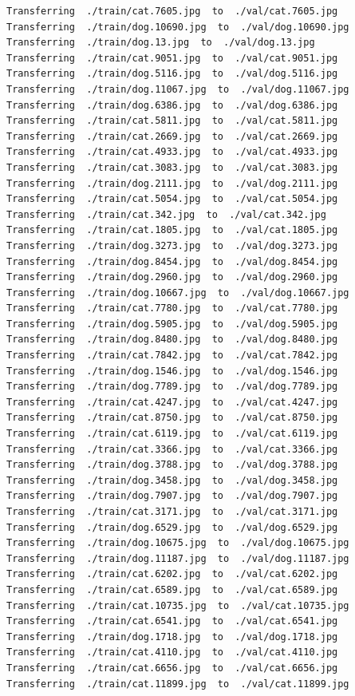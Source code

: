 \documentclass[]{book}
\theoremstyle{definition}
\theoremstyle{definition}
\theoremstyle{definition}
\theoremstyle{remark}
\begin{document}
\begin{verbatim}
Transferring  ./train/cat.7605.jpg  to  ./val/cat.7605.jpg
Transferring  ./train/dog.10690.jpg  to  ./val/dog.10690.jpg
Transferring  ./train/dog.13.jpg  to  ./val/dog.13.jpg
Transferring  ./train/cat.9051.jpg  to  ./val/cat.9051.jpg
Transferring  ./train/dog.5116.jpg  to  ./val/dog.5116.jpg
Transferring  ./train/dog.11067.jpg  to  ./val/dog.11067.jpg
Transferring  ./train/dog.6386.jpg  to  ./val/dog.6386.jpg
Transferring  ./train/cat.5811.jpg  to  ./val/cat.5811.jpg
Transferring  ./train/cat.2669.jpg  to  ./val/cat.2669.jpg
Transferring  ./train/cat.4933.jpg  to  ./val/cat.4933.jpg
Transferring  ./train/cat.3083.jpg  to  ./val/cat.3083.jpg
Transferring  ./train/dog.2111.jpg  to  ./val/dog.2111.jpg
Transferring  ./train/cat.5054.jpg  to  ./val/cat.5054.jpg
Transferring  ./train/cat.342.jpg  to  ./val/cat.342.jpg
Transferring  ./train/cat.1805.jpg  to  ./val/cat.1805.jpg
Transferring  ./train/dog.3273.jpg  to  ./val/dog.3273.jpg
Transferring  ./train/dog.8454.jpg  to  ./val/dog.8454.jpg
Transferring  ./train/dog.2960.jpg  to  ./val/dog.2960.jpg
Transferring  ./train/dog.10667.jpg  to  ./val/dog.10667.jpg
Transferring  ./train/cat.7780.jpg  to  ./val/cat.7780.jpg
Transferring  ./train/dog.5905.jpg  to  ./val/dog.5905.jpg
Transferring  ./train/dog.8480.jpg  to  ./val/dog.8480.jpg
Transferring  ./train/cat.7842.jpg  to  ./val/cat.7842.jpg
Transferring  ./train/dog.1546.jpg  to  ./val/dog.1546.jpg
Transferring  ./train/dog.7789.jpg  to  ./val/dog.7789.jpg
Transferring  ./train/cat.4247.jpg  to  ./val/cat.4247.jpg
Transferring  ./train/cat.8750.jpg  to  ./val/cat.8750.jpg
Transferring  ./train/cat.6119.jpg  to  ./val/cat.6119.jpg
Transferring  ./train/cat.3366.jpg  to  ./val/cat.3366.jpg
Transferring  ./train/dog.3788.jpg  to  ./val/dog.3788.jpg
Transferring  ./train/dog.3458.jpg  to  ./val/dog.3458.jpg
Transferring  ./train/dog.7907.jpg  to  ./val/dog.7907.jpg
Transferring  ./train/cat.3171.jpg  to  ./val/cat.3171.jpg
Transferring  ./train/dog.6529.jpg  to  ./val/dog.6529.jpg
Transferring  ./train/dog.10675.jpg  to  ./val/dog.10675.jpg
Transferring  ./train/dog.11187.jpg  to  ./val/dog.11187.jpg
Transferring  ./train/cat.6202.jpg  to  ./val/cat.6202.jpg
Transferring  ./train/cat.6589.jpg  to  ./val/cat.6589.jpg
Transferring  ./train/cat.10735.jpg  to  ./val/cat.10735.jpg
Transferring  ./train/cat.6541.jpg  to  ./val/cat.6541.jpg
Transferring  ./train/dog.1718.jpg  to  ./val/dog.1718.jpg
Transferring  ./train/cat.4110.jpg  to  ./val/cat.4110.jpg
Transferring  ./train/cat.6656.jpg  to  ./val/cat.6656.jpg
Transferring  ./train/cat.11899.jpg  to  ./val/cat.11899.jpg

\end{verbatim}
\end{document}
